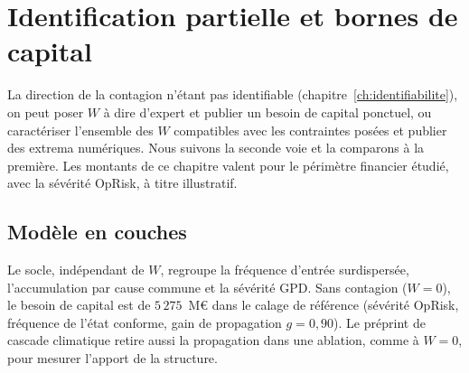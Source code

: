 \chapter{Identification partielle et bornes de capital}
\label{chap:partielle}

La direction de la contagion n'étant pas identifiable (chapitre~\ref{ch:identifiabilite}), on peut
poser $W$ à dire d'expert et publier un besoin de capital ponctuel, ou caractériser l'ensemble des $W$
compatibles avec les contraintes posées et publier des extrema numériques. Nous suivons la seconde voie et la comparons à la
première. Les montants de ce chapitre valent pour le périmètre financier étudié, avec la
sévérité OpRisk, à titre illustratif.

\section{Modèle en couches}

Le socle, indépendant de $W$, regroupe la fréquence d'entrée surdispersée, l'accumulation par cause
commune et la sévérité GPD. Sans contagion ($W = 0$), le besoin de capital est de $5\,275$~M\euro{} dans le calage
de référence (sévérité OpRisk, fréquence de l'état conforme, gain de propagation $g=0{,}90$). Le préprint de cascade climatique \citep{ccrn2026} retire aussi la propagation dans une ablation, comme à $W=0$,
pour mesurer l'apport de la structure.

